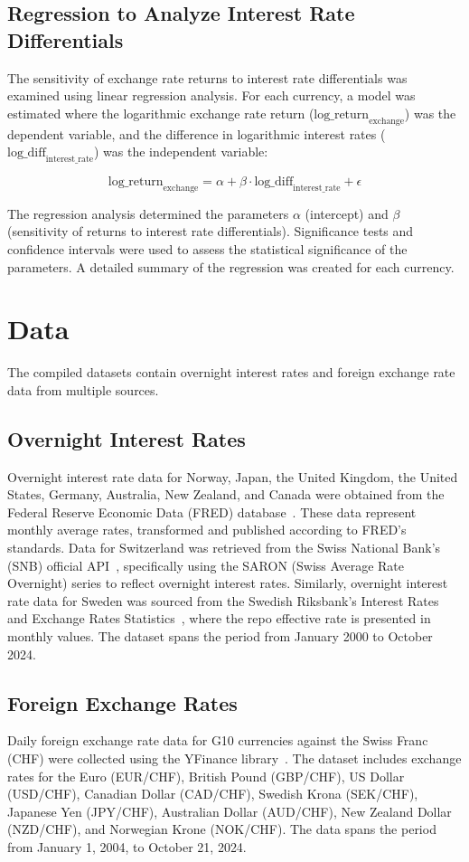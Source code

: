 \documentclass{article}
\begin{document}
\subsection{Regression to Analyze Interest Rate Differentials}

The sensitivity of exchange rate returns to interest rate differentials was examined using linear regression analysis. For each currency, a model was estimated where the logarithmic exchange rate return (\(\text{log\_return}_{\text{exchange}}\)) was the dependent variable, and the difference in logarithmic interest rates (\(\text{log\_diff}_{\text{interest\_rate}}\)) was the independent variable:

\[
\text{log\_return}_{\text{exchange}} = \alpha + \beta \cdot \text{log\_diff}_{\text{interest\_rate}} + \epsilon
\]

The regression analysis determined the parameters \(\alpha\) (intercept) and \(\beta\) (sensitivity of returns to interest rate differentials). Significance tests and confidence intervals were used to assess the statistical significance of the parameters. A detailed summary of the regression was created for each currency.

\section{Data}
The compiled datasets contain overnight interest rates and foreign exchange rate data from multiple sources.

\subsection{Overnight Interest Rates}
Overnight interest rate data for Norway, Japan, the United Kingdom, the United States, Germany, Australia, New Zealand, and Canada were obtained from the Federal Reserve Economic Data (FRED) database~\cite{fred}. These data represent monthly average rates, transformed and published according to FRED's standards. Data for Switzerland was retrieved from the Swiss National Bank's (SNB) official API~\cite{snb}, specifically using the SARON (Swiss Average Rate Overnight) series to reflect overnight interest rates. Similarly, overnight interest rate data for Sweden was sourced from the Swedish Riksbank’s Interest Rates and Exchange Rates Statistics~\cite{riksbank}, where the repo effective rate is presented in monthly values. The dataset spans the period from January 2000 to October 2024.

\subsection{Foreign Exchange Rates}
Daily foreign exchange rate data for G10 currencies against the Swiss Franc (CHF) were collected using the YFinance library~\cite{yfinance}. The dataset includes exchange rates for the Euro (EUR/CHF), British Pound (GBP/CHF), US Dollar (USD/CHF), Canadian Dollar (CAD/CHF), Swedish Krona (SEK/CHF), Japanese Yen (JPY/CHF), Australian Dollar (AUD/CHF), New Zealand Dollar (NZD/CHF), and Norwegian Krone (NOK/CHF). The data spans the period from January 1, 2004, to October 21, 2024.
\end{document}
